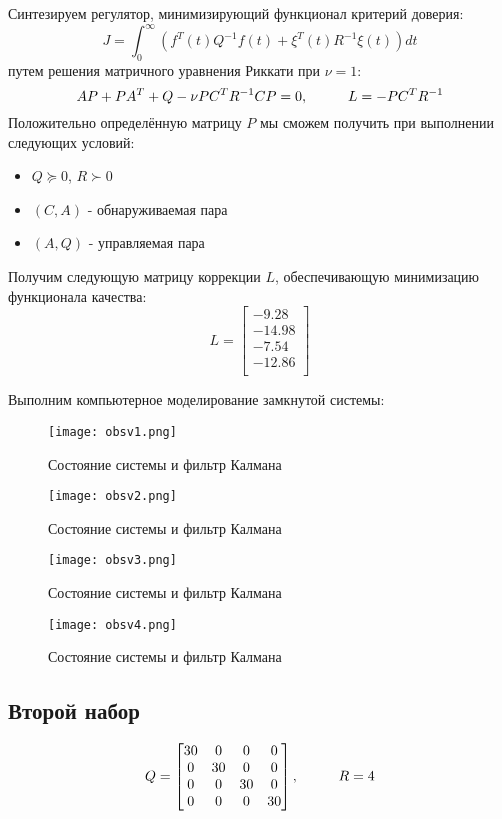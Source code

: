Синтезируем регулятор, минимизирующий функционал критерий доверия:
$$
  J = \int_{0}^{\infty} (f^T(t)Q^{-1} f(t) + \xi^T(t) R^{-1} \xi(t))dt  
$$
путем решения матричного уравнения Риккати при $\nu = 1$:
$$
    AP + PA^T + Q - \nu PC^T R^{-1} C P = 0, \hspace*{1cm} L = -PC^T R^{-1}
$$
Положительно определённую матрицу $P$ мы сможем получить при выполнении следующих условий:
\begin{itemize}
  \item $Q \succeq 0$, $R \succ 0$
  \item $(C,A)$ - обнаруживаемая пара
  \item $(A, Q)$ - управляемая пара
\end{itemize}
Получим следующую матрицу коррекции $L$, обеспечивающую минимизацию функционала качества:
$$
   L = \begin{bmatrix}
    -9.28 \\
    -14.98 \\
    -7.54 \\
    -12.86 \\
\end{bmatrix}
$$

Выполним компьютерное моделирование замкнутой системы:

\begin{figure}[ht]
  \centering
  \texttt{[image: obsv1.png]}
  \caption{Состояние системы и фильтр Калмана}
\end{figure}
\newpage
\begin{figure}[ht]
  \centering
  \texttt{[image: obsv2.png]}
  \caption{Состояние системы и фильтр Калмана}
\end{figure}
\newpage
\begin{figure}[ht]
  \centering
  \texttt{[image: obsv3.png]}
  \caption{Состояние системы и фильтр Калмана}
\end{figure}
\begin{figure}[ht]
  \centering
  \texttt{[image: obsv4.png]}
  \caption{Состояние системы и фильтр Калмана}
\end{figure}


\subsection{Второй набор}
$$
  Q = \begin{bmatrix}
                    30 & 0 & 0 & 0\\
                    0 & 30 & 0 & 0\\
                    0 & 0 & 30 & 0\\
                    0 & 0 & 0 & 30
                      \end{bmatrix}, \hspace*{1cm} R=4
$$

